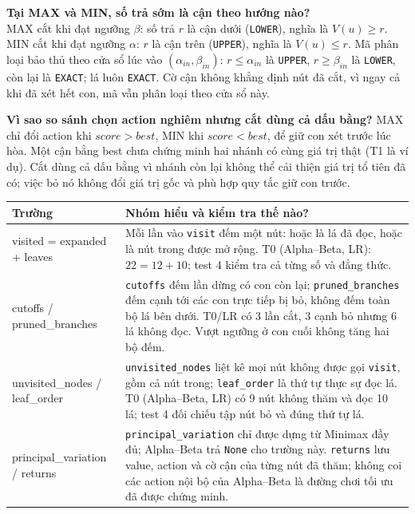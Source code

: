 \documentclass[11pt,a4paper]{article}
\newcommand{\head}[1]{\par\Needspace{3\baselineskip}\medskip{\large\sffamily\bfseries\color{Ink}#1}\par}
\begin{document}
\clearpage
\head{3. Những quy tắc không được nhầm}
\textbf{Tại MAX và MIN, số trả sớm là cận theo hướng nào?}\\ MAX cắt khi đạt ngưỡng $\beta$: số trả $r$ là cận dưới (\texttt{LOWER}), nghĩa là $V(u)\ge r$. MIN cắt khi đạt ngưỡng $\alpha$: $r$ là cận trên (\texttt{UPPER}), nghĩa là $V(u)\le r$. Mã phân loại bảo thủ theo cửa sổ lúc vào $(\alpha_{in},\beta_{in})$: $r\le\alpha_{in}$ là \texttt{UPPER}, $r\ge\beta_{in}$ là \texttt{LOWER}, còn lại là \texttt{EXACT}; lá luôn \texttt{EXACT}. Cờ cận không khẳng định nút đã cắt, vì ngay cả khi đã xét hết con, mã vẫn phân loại theo cửa sổ này.\par \textbf{Vì sao so sánh chọn action nghiêm nhưng cắt dùng cả dấu bằng?} MAX chỉ đổi action khi $\mathit{score}>\mathit{best}$, MIN khi $\mathit{score}<\mathit{best}$, để giữ con xét trước lúc hòa. Một cận bằng best chưa chứng minh hai nhánh có cùng giá trị thật (T1 là ví dụ). Cắt dùng cả dấu bằng vì nhánh còn lại không thể cải thiện giá trị tổ tiên đã có; việc bỏ nó không đổi giá trị gốc và phù hợp quy tắc giữ con trước.\par\smallskip
\begingroup\footnotesize\renewcommand{\arraystretch}{1.25}\begin{tabularx}{\linewidth}{XX}\toprule
\textbf{Trường} & \textbf{Nhóm hiểu và kiểm tra thế nào?}\\\midrule
visited = expanded + leaves & Mỗi lần vào \texttt{visit} đếm một nút: hoặc là lá đã đọc, hoặc là nút trong được mở rộng. T0 (Alpha--Beta, LR): $22=12+10$; test 4 kiểm tra cả từng số và đẳng thức.\\
cutoffs / pruned\_branches & \texttt{cutoffs} đếm lần dừng có con còn lại; \texttt{pruned\_branches} đếm cạnh tới các con trực tiếp bị bỏ, không đếm toàn bộ lá bên dưới. T0/LR có 3 lần cắt, 3 cạnh bỏ nhưng 6 lá không đọc. Vượt ngưỡng ở con cuối không tăng hai bộ đếm.\\
unvisited\_nodes / leaf\_order & \texttt{unvisited\_nodes} liệt kê mọi nút không được gọi \texttt{visit}, gồm cả nút trong; \texttt{leaf\_order} là thứ tự thực sự đọc lá. T0 (Alpha--Beta, LR) có 9 nút không thăm và đọc 10 lá; test 4 đối chiếu tập nút bỏ và đúng thứ tự lá.\\
principal\_variation / returns & \texttt{principal\_variation} chỉ được dựng từ Minimax đầy đủ; Alpha--Beta trả \texttt{None} cho trường này. \texttt{returns} lưu value, action và cờ cận của từng nút đã thăm; không coi các action nội bộ của Alpha--Beta là đường chơi tối ưu đã được chứng minh.\\
\bottomrule\end{tabularx}\endgroup\par\smallskip
\end{document}
